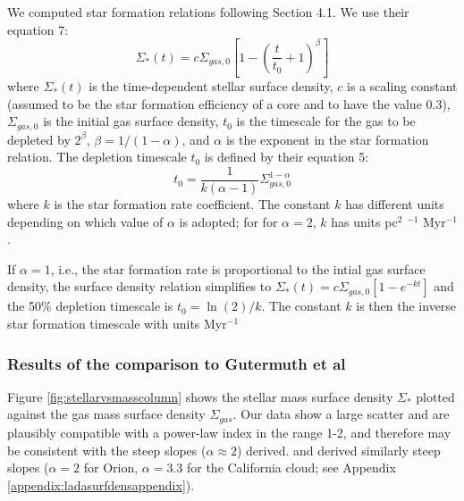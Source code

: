 \documentclass[twocolumn]{aastex61}
\begin{document}
We computed star formation relations following \citet{Gutermuth2011a} Section 4.1.
We use their equation 7:
\begin{equation}
    \label{eqn:stellarsurfdens}
    \Sigma_*(t) = c \Sigma_{gas,0} \left[1-\left(\frac{t}{t_0}+1\right)^\beta\right]
\end{equation}
where $\Sigma_*(t)$ is the time-dependent stellar surface density, $c$ is a
scaling constant (assumed to be the star formation efficiency of a core and
to have the value 0.3), $\Sigma_{gas,0}$ is the initial gas surface density,  $t_0$
is the timescale for the gas to be depleted by $2^{\beta}$, $\beta =
1/(1-\alpha)$, and $\alpha$ is
the exponent in the star formation relation.
The depletion timescale $t_0$ is defined by their equation 5:
\begin{equation}
    t_0 = \frac{1}{k(\alpha-1)} \Sigma_{gas,0}^{1-\alpha}
\end{equation}
where $k$ is the star formation rate coefficient.  The constant $k$ has
different units depending on which value of $\alpha$ is adopted; for
for $\alpha=2$, $k$ has units pc$^{2}$ \msun$^{-1}$ Myr$^{-1}$.

If $\alpha=1$, i.e., the star formation rate is proportional to the intial gas
surface density, the surface density relation simplifies to $\Sigma_*(t) = c
\Sigma_{gas,0}[1-e^{-kt}]$ and the 50\% depletion timescale is $t_0=\ln(2)/k$.
The constant $k$ is then the inverse star formation timescale with units
Myr$^{-1}$


\subsubsection{Results of the comparison to Gutermuth et al}
\label{sec:gutermuthcomparison}



Figure \ref{fig:stellarvsmasscolumn} shows the stellar mass surface density
$\Sigma_*$ plotted against the gas mass surface density $\Sigma_{gas}$.
Our data show a large scatter and are plausibly compatible with a
power-law index in the range 1-2, and therefore may be consistent with the
steep slopes ($\alpha\approx2$) \citet{Gutermuth2011a} derived.
\citet{Lada2017a} and \citet{Lombardi2014a} derived similarly steep
slopes ($\alpha=2$ for Orion, $\alpha=3.3$ for the California cloud;
see Appendix \ref{appendix:ladasurfdensappendix}).
\end{document}
